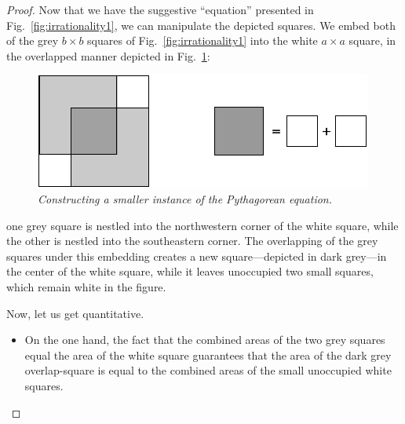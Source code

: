 \begin{proof}
Now that we have the suggestive ``equation'' presented in Fig.~\ref{fig:irrationality1}, we can manipulate the depicted squares.  We embed both of the grey $b \times b$ squares of
Fig.~\ref{fig:irrationality1} into the white $a \times a$ square, in the overlapped manner depicted in Fig.~\ref{fig:irrationality2}:
\begin{figure}[htb]
\begin{center}
       \includegraphics[scale=0.4]{FiguresArithmetic/sqrt2final}
\caption{{\it Constructing a smaller instance of the Pythagorean equation.}
\label{fig:irrationality2}}
\end{center}
\end{figure}
one grey square is nestled into the northwestern corner of the white square, while the other is nestled into the southeastern corner.  The overlapping of the grey squares under this embedding creates a new square---depicted in dark grey---in the center of the white square, while it leaves unoccupied two small squares, which remain white in the figure.

\smallskip

Now, let us get quantitative.
\begin{itemize}
\item
On the one hand, the fact that the combined areas of the two grey squares equal the area of the white square guarantees that the area of the dark grey overlap-square is equal to the combined areas of the small unoccupied white squares.


\end{itemize}
\end{proof}
